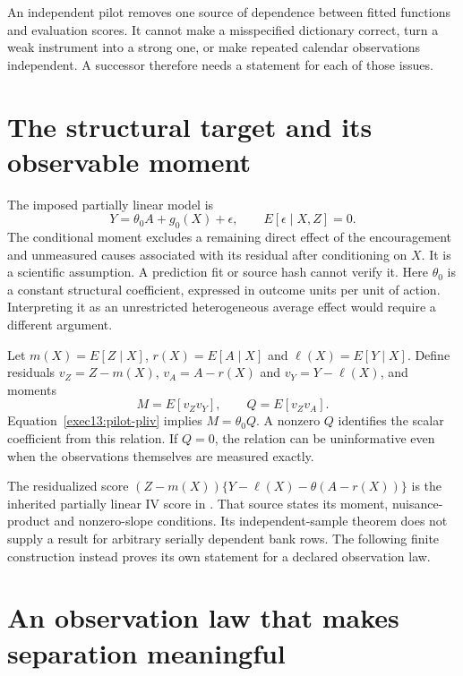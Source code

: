An independent pilot removes one source of dependence between fitted functions
and evaluation scores. It cannot make a misspecified dictionary correct, turn
a weak instrument into a strong one, or make repeated calendar observations
independent. A successor therefore needs a statement for each of those issues.

\section{The structural target and its observable moment}

The imposed partially linear model is
\begin{equation}
 Y=\theta_0 A+g_0(X)+\epsilon,
 \qquad E[\epsilon\mid X,Z]=0.
 \label{exec13:pilot-pliv}
\end{equation}
The conditional moment excludes a remaining direct effect of the encouragement
and unmeasured causes associated with its residual after conditioning on $X$.
It is a scientific assumption. A prediction fit or source hash cannot verify it.
Here $\theta_0$ is a constant structural coefficient, expressed in outcome
units per unit of action. Interpreting it as an unrestricted heterogeneous
average effect would require a different argument.

Let $m(X)=E[Z\mid X]$, $r(X)=E[A\mid X]$ and
$\ell(X)=E[Y\mid X]$. Define residuals
$v_Z=Z-m(X)$, $v_A=A-r(X)$ and $v_Y=Y-\ell(X)$, and moments
\begin{equation}
 M=E[v_Zv_Y],\qquad Q=E[v_Zv_A].
 \label{exec13:pilot-moments}
\end{equation}
Equation~\eqref{exec13:pilot-pliv} implies $M=\theta_0 Q$. A nonzero $Q$
identifies the scalar coefficient from this relation. If $Q=0$, the relation
can be uninformative even when the observations themselves are measured exactly.

The residualized score
$(Z-m(X))\{Y-\ell(X)-\theta(A-r(X))\}$ is the inherited partially linear IV
score in \citet[Section~4.2, equation~(4.8)]{dml2018}. That source states its
moment, nuisance-product and nonzero-slope conditions. Its independent-sample
theorem does not supply a result for arbitrary serially dependent bank rows.
The following finite construction instead proves its own statement for a
declared observation law.

\section{An observation law that makes separation meaningful}

